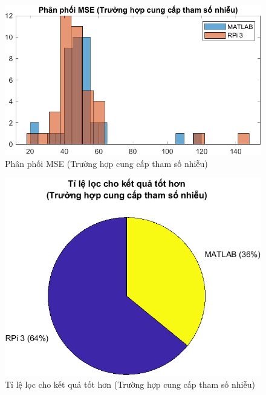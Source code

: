 \begin{figure}[H]
    \centering
    \includegraphics[width=.75\linewidth]{../images/hist_gaussian_compare_var0p01_mse.png}
    \caption{Phân phối MSE (Trường hợp cung cấp tham số nhiễu)}
    \label{fig:hist_gaussian_compare_var0p01_mse}
\end{figure}

\begin{figure}[H]
    \centering
    \includegraphics[width=.75\linewidth]{../images/pie_gaussian_compare_var0p01_mse.png}
    \caption{Tỉ lệ lọc cho kết quả tốt hơn (Trường hợp cung cấp tham số nhiễu)}
    \label{fig:pie_gaussian_compare_var0p01_mse}
\end{figure}